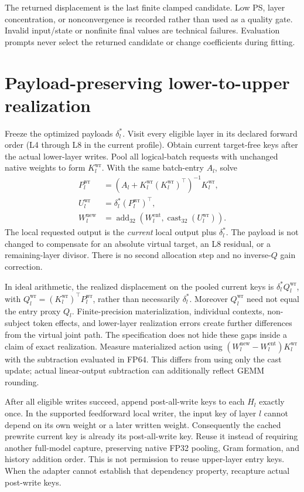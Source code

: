 \documentclass[11pt]{article}
\newcommand{\entry}{\mathrm{ent}}
\newcommand{\wrstate}{\mathrm{wr}}
\begin{document}
The returned displacement is the last finite clamped candidate. Low PS,
layer concentration, or nonconvergence is recorded rather than used as a
quality gate. Invalid input/state or nonfinite final values are technical
failures. Evaluation prompts never select the returned candidate or
change coefficients during fitting.

\section{Payload-preserving lower-to-upper realization}

Freeze the optimized payloads $\delta_l^*$. Visit every eligible layer
in its declared forward order (L4 through L8 in the current profile).
Obtain current target-free keys after the actual lower-layer writes.
Pool all logical-batch requests with unchanged native weights to form
$K_l^{\wrstate}$. With the same batch-entry $A_l$, solve
\begin{align}
 P_l^{\wrstate}&=(A_l+K_l^{\wrstate}(K_l^{\wrstate})^\top)^{-1}K_l^{\wrstate},\\
 U_l^{\wrstate}&=\delta_l^*(P_l^{\wrstate})^\top,\\
 W_l^{\mathrm{new}}&=\operatorname{add}_{32}
             \left(W_l^{\entry},\operatorname{cast}_{32}(U_l^{\wrstate})\right).
\end{align}
The local requested output is the \emph{current} local output plus
$\delta_l^*$. The payload is not changed to compensate for an absolute
virtual target, an L8 residual, or a remaining-layer divisor. There is no
second allocation step and no inverse-$Q$ gain correction.

In ideal arithmetic, the realized displacement on the pooled current keys
is $\delta_l^*Q_l^{\wrstate}$, with
$Q_l^{\wrstate}=(K_l^{\wrstate})^\top P_l^{\wrstate}$, rather than necessarily
$\delta_l^*$. Moreover $Q_l^{\wrstate}$ need not equal the entry proxy $Q_l$.
Finite-precision materialization, individual contexts, non-subject token
effects, and lower-layer realization errors create further differences
from the virtual joint path. The specification does not hide these gaps
inside a claim of exact realization.
Measure materialized action using $(W_l^{\mathrm{new}}-W_l^{\entry})K_l^{\wrstate}$
with the subtraction evaluated in FP64. This differs from using only the
cast update; actual linear-output subtraction can additionally reflect
GEMM rounding.

After all eligible writes succeed, append post-all-write keys to each
$H_l$ exactly once. In the supported feedforward local writer, the input
key of layer $l$ cannot depend on its own weight or a later written weight.
Consequently the cached prewrite current key is already its post-all-write
key. Reuse it instead of requiring another full-model capture, preserving
native FP32 pooling, Gram formation, and history addition order. This is
not permission to reuse upper-layer entry keys. When the adapter cannot
establish that dependency property, recapture actual post-write keys.
\end{document}
